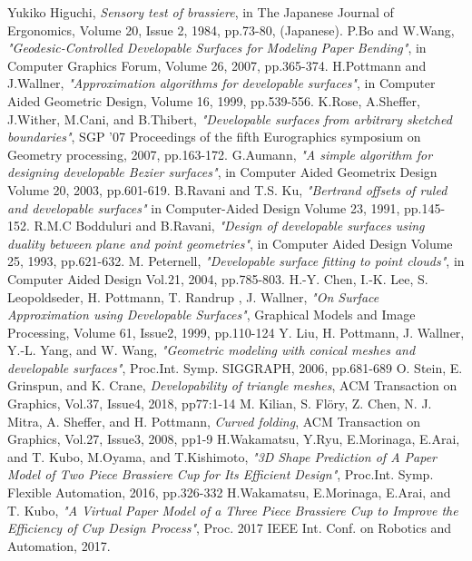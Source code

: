 \documentclass[E]{scitrans}
\begin{document}
\begin{thebibliography}{99}
	
	Yukiko Higuchi, {\it Sensory test of brassiere}, in The Japanese Journal of Ergonomics, Volume 20, Issue 2, 1984, pp.73-80, (Japanese).
	 P.Bo and W.Wang, {\it "Geodesic-Controlled Developable Surfaces for Modeling Paper Bending"}, in Computer Graphics Forum, Volume 26, 2007, pp.365-374.
	 H.Pottmann and J.Wallner, {\it "Approximation algorithms for developable surfaces"}, in Computer Aided Geometric Design, Volume 16, 1999, pp.539-556.
	 K.Rose, A.Sheffer, J.Wither, M.Cani, and B.Thibert, {\it "Developable surfaces from arbitrary sketched boundaries"}, SGP ’07 Proceedings of the ﬁfth Eurographics symposium on Geometry processing, 2007, pp.163-172.
	 G.Aumann, {\it "A simple algorithm for designing developable Bezier surfaces"}, in Computer Aided Geometrix Design Volume 20, 2003, pp.601-619.
	 B.Ravani and T.S. Ku, {\it "Bertrand offsets of ruled and developable surfaces"} in Computer-Aided Design Volume 23, 1991, pp.145-152. 
	R.M.C Bodduluri and B.Ravani, {\it "Design of developable surfaces using duality between plane and point geometries"}, in Computer Aided Design Volume 25, 1993, pp.621-632.
	M. Peternell, {\it "Developable surface fitting to point clouds"}, in Computer Aided Design Vol.21, 2004, pp.785-803.
	H.-Y. Chen, I.-K. Lee, S. Leopoldseder, H. Pottmann, T. Randrup , J. Wallner, {\it "On Surface Approximation using Developable Surfaces"}, Graphical Models and Image Processing, Volume 61, Issue2, 1999, pp.110-124
	 Y. Liu, H. Pottmann, J. Wallner, Y.-L. Yang, and W. Wang, {\it "Geometric modeling with conical meshes and developable surfaces"}, Proc.Int. Symp. SIGGRAPH, 2006, pp.681-689
	 O. Stein, E. Grinspun, and K. Crane, {\it Developability of triangle meshes}, ACM Transaction on Graphics, Vol.37, Issue4, 2018, pp77:1-14
	 M. Kilian, S. Flöry, Z. Chen, N. J. Mitra, A. Sheffer, and H. Pottmann, {\it Curved folding}, ACM Transaction on Graphics, Vol.27, Issue3, 2008, pp1-9
	 H.Wakamatsu, Y.Ryu, E.Morinaga, E.Arai, and T. Kubo, M.Oyama, and T.Kishimoto, {\it "3D Shape Prediction of A Paper Model of Two Piece Brassiere Cup for Its Efficient Design"}, Proc.Int. Symp. Flexible Automation, 2016, pp.326-332
	 H.Wakamatsu, E.Morinaga, E.Arai, and T. Kubo, {\it "A Virtual Paper Model of a Three Piece Brassiere Cup to Improve the Efficiency of Cup Design Process"}, Proc. 2017 IEEE Int. Conf. on Robotics and Automation, 2017. 

\end{thebibliography}
\end{document}
